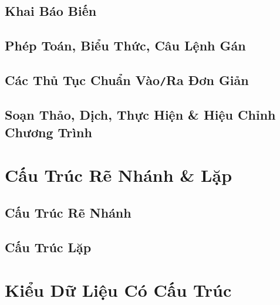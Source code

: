 \documentclass[oneside]{book}
\numberwithin{equation}{section}
\begin{document}
\section{Khai Báo Biến}


\section{Phép Toán, Biểu Thức, Câu Lệnh Gán}


\section{Các Thủ Tục Chuẩn Vào\texttt{/}Ra Đơn Giản}


\section{Soạn Thảo, Dịch, Thực Hiện \& Hiệu Chỉnh Chương Trình}


\chapter{Cấu Trúc Rẽ Nhánh \& Lặp}

\section{Cấu Trúc Rẽ Nhánh}


\section{Cấu Trúc Lặp}


\chapter{Kiểu Dữ Liệu Có Cấu Trúc}
\end{document}
